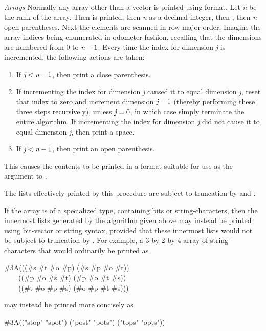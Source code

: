 \begin{flushdesc}
\item[\emph{Arrays}]
Normally any array other than a vector is printed
using  format.  Let \emph{n} be the rank of the array.
Then \cd{\#} is printed, then \emph{n} as a decimal integer,
then , then \emph{n} open parentheses.  Next the elements
are scanned in row-major order.  Imagine the array indices being
enumerated in odometer fashion, recalling that the dimensions
are numbered from 0 to $\emph{n}-1$.  Every time the index for
dimension \emph{j} is incremented, the following actions are taken:
\begin{enumerate}
\item
If $\emph{j}<\emph{n}-1$, then print a close parenthesis.

\item
If incrementing the index for dimension \emph{j} caused it to equal
dimension \emph{j}, reset that index to zero and increment dimension
$\emph{j}-1$ (thereby performing these three steps recursively),
unless $\emph{j}=0$, in which case simply terminate the entire algorithm.
If incrementing the index for dimension \emph{j} did not cause it to
equal dimension \emph{j}, then print a space.

\item
If $\emph{j}<\emph{n}-1$, then print an open parenthesis.
\end{enumerate}
This causes the contents to be printed in a format suitable for
use as the  argument to .
\begin{obsolete}
The lists effectively printed by this procedure are subject to
truncation by  and .
\end{obsolete}

If the array is of a specialized type, containing bits or string-characters,
then the innermost lists generated by the algorithm given above may instead
be printed using bit-vector or string syntax, provided that these innermost
lists would not be subject to truncation by .  For example,
a 3-by-2-by-4 array of string-characters that would ordinarily be printed as
\begin{lisp}
\#3A(((\#{\Xbackslash}s \#{\Xbackslash}t \#{\Xbackslash}o \#{\Xbackslash}p) (\#{\Xbackslash}s \#{\Xbackslash}p \#{\Xbackslash}o \#{\Xbackslash}t)) \\
~~~~((\#{\Xbackslash}p \#{\Xbackslash}o \#{\Xbackslash}s \#{\Xbackslash}t) (\#{\Xbackslash}p \#{\Xbackslash}o \#{\Xbackslash}t \#{\Xbackslash}s)) \\
~~~~((\#{\Xbackslash}t \#{\Xbackslash}o \#{\Xbackslash}p \#{\Xbackslash}s) (\#{\Xbackslash}o \#{\Xbackslash}p \#{\Xbackslash}t \#{\Xbackslash}s)))
\end{lisp}
may instead be printed more concisely as
\begin{lisp}
\#3A(("stop" "spot") ("post" "pots") ("tops" "opts"))
\end{lisp}


\end{flushdesc}
